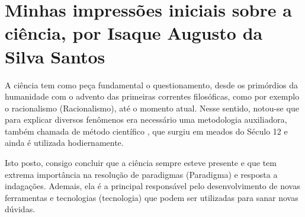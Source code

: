 \section{Minhas impressões iniciais sobre a ciência, por Isaque Augusto da Silva Santos}

A ciência tem como peça fundamental o questionamento, desde os primórdios da humanidade com o advento das primeiras correntes filosóficas, como por exemplo o racionalismo (\gls{Racionalismo}), até o momento atual. Nesse sentido, notou-se que para explicar diversos fenômenos era necessário uma metodologia auxiliadora, também chamada de método científico \citet{wikipedia_metodo_2021}, que surgiu em meados do Século 12 e ainda é utilizada hodiernamente.

Isto posto, consigo concluir que a ciência sempre esteve presente e que tem extrema importância na resolução de paradigmas (\gls{Paradigma}) e resposta a indagações. Ademais, ela é a principal responsável pelo desenvolvimento de novas ferramentas e tecnologias (\gls{tecnologia}) que podem ser utilizadas para sanar novas dúvidas.
